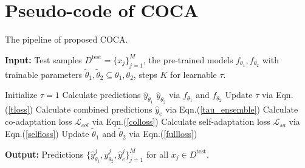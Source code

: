 \clearpage
\setcounter{page}{1}
\maketitlesupplementary
\appendix
\section{Pseudo-code of COCA}
\label{pscode}
\begin{algorithm}
\begin{spacing}{1.1}
\caption{The pipeline of proposed COCA.}
\label{alg:coca}
\textbf{Input:} Test samples $D^{\text{test}}=\{x_j\}_{j=1}^M$, the pre-trained models $f_{\theta_{1}}, f_{\theta_{2}}$ with trainable parameters $\widetilde{\theta}_{1}, \widetilde{\theta}_{2} \subseteq  \theta_{1}, \theta_{2}$, steps $K$ for learnable $\tau$.
\begin{algorithmic}[1]

    \STATE Initialize $\tau = 1 $
        \STATE Calculate predictions $\hat{y}_{\theta_{1}}$ $\hat{y}_{\theta_{2}}$ via ${f}
        _{\theta_{1}}$ and ${f}_{\theta_{2}}$
            \STATE Update $\tau$ via Eqn.(\ref{tloss})
        \ENDFOR
        \STATE Calculate combined predictions $\hat{y}_{e}$ via Eqn.(\ref{tau_ensemble})
        \STATE Calculate co-adaptation loss $\mathcal{L}_{col}$ via Eqn.(\ref{colloss})
        \STATE Calculate self-adaptation loss $\mathcal{L}_{sa}$ via Eqn.(\ref{selfloss})
        \STATE Update $\widetilde{\theta}_{1}$ and $\widetilde{\theta}_{2}$ via Eqn.(\ref{fullloss})
        
    \ENDFOR 
\end{algorithmic}
\textbf{Output:} Predictions $\{ \hat{y}^j_{\theta_{1}}, \hat{y}^j_{\theta_{2}},\hat{y}^j_e\}_{j=1}^M $ for all $x_{j} \in D^{\text{test}}$.
\end{spacing}
\end{algorithm}


